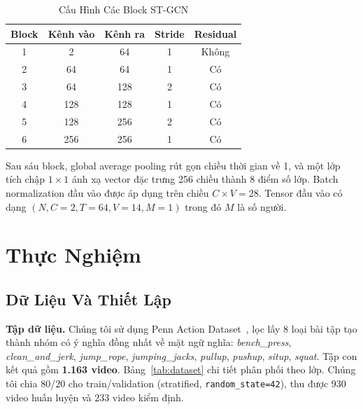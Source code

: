 \documentclass[conference]{IEEEtran}
\begin{document}
\begin{table}[!t]
\caption{Cấu Hình Các Block ST-GCN}
\label{tab:arch}
\centering
\begin{tabular}{ccccc}
\toprule
Block & Kênh vào & Kênh ra & Stride & Residual \\
\midrule
1 & 2   & 64  & 1 & Không \\
2 & 64  & 64  & 1 & Có    \\
3 & 64  & 128 & 2 & Có    \\
4 & 128 & 128 & 1 & Có    \\
5 & 128 & 256 & 2 & Có    \\
6 & 256 & 256 & 1 & Có    \\
\bottomrule
\end{tabular}
\end{table}

Sau sáu block, global average pooling rút gọn chiều thời gian về 1, và một lớp
tích chập $1 \times 1$ ánh xạ vector đặc trưng 256 chiều thành 8 điểm số lớp.
Batch normalization đầu vào được áp dụng trên chiều $C \times V = 28$. Tensor đầu
vào có dạng $(N, C{=}2, T{=}64, V{=}14, M{=}1)$ trong đó $M$ là số người.

\section{Thực Nghiệm}
\label{sec:exp}

\subsection{Dữ Liệu Và Thiết Lập}
\label{sec:setup}

\textbf{Tập dữ liệu.} Chúng tôi sử dụng Penn Action Dataset~\cite{zhang2013pennaction},
lọc lấy 8 loại bài tập tạo thành nhóm có ý nghĩa đồng nhất về mặt ngữ nghĩa:
\textit{bench\_press}, \textit{clean\_and\_jerk}, \textit{jump\_rope},
\textit{jumping\_jacks}, \textit{pullup}, \textit{pushup}, \textit{situp},
\textit{squat}. Tập con kết quả gồm \textbf{1.163 video}. Bảng~\ref{tab:dataset}
chi tiết phân phối theo lớp. Chúng tôi chia 80/20 cho train/validation (stratified,
\texttt{random\_state=42}), thu được 930 video huấn luyện và 233 video kiểm định.
\end{document}
